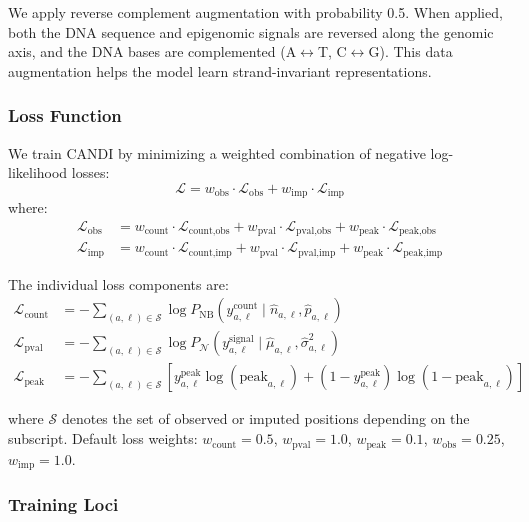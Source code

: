 We apply reverse complement augmentation with probability 0.5. When applied, both the DNA sequence and epigenomic signals are reversed along the genomic axis, and the DNA bases are complemented (A$\leftrightarrow$T, C$\leftrightarrow$G). This data augmentation helps the model learn strand-invariant representations.

\subsubsection{Loss Function}

We train CANDI by minimizing a weighted combination of negative log-likelihood losses:
\begin{equation}
    \mathcal{L} = w_{\text{obs}} \cdot \mathcal{L}_{\text{obs}} + w_{\text{imp}} \cdot \mathcal{L}_{\text{imp}}
\end{equation}
where:
\begin{align}
    \mathcal{L}_{\text{obs}} &= w_{\text{count}} \cdot \mathcal{L}_{\text{count,obs}} + w_{\text{pval}} \cdot \mathcal{L}_{\text{pval,obs}} + w_{\text{peak}} \cdot \mathcal{L}_{\text{peak,obs}} \\
    \mathcal{L}_{\text{imp}} &= w_{\text{count}} \cdot \mathcal{L}_{\text{count,imp}} + w_{\text{pval}} \cdot \mathcal{L}_{\text{pval,imp}} + w_{\text{peak}} \cdot \mathcal{L}_{\text{peak,imp}}
\end{align}

The individual loss components are:
\begin{align}
    \mathcal{L}_{\text{count}} &= -\sum_{(a,\ell) \in \mathcal{S}} \log P_{\text{NB}}\left(y_{a,\ell}^{\text{count}} \mid \hat{n}_{a,\ell}, \hat{p}_{a,\ell}\right) \\
    \mathcal{L}_{\text{pval}} &= -\sum_{(a,\ell) \in \mathcal{S}} \log P_{\mathcal{N}}\left(y_{a,\ell}^{\text{signal}} \mid \hat{\mu}_{a,\ell}, \hat{\sigma}^2_{a,\ell}\right) \\
    \mathcal{L}_{\text{peak}} &= -\sum_{(a,\ell) \in \mathcal{S}} \left[ y_{a,\ell}^{\text{peak}} \log(\text{peak}_{a,\ell}) + (1 - y_{a,\ell}^{\text{peak}}) \log(1 - \text{peak}_{a,\ell}) \right]
\end{align}

where $\mathcal{S}$ denotes the set of observed or imputed positions depending on the subscript. Default loss weights: $w_{\text{count}} = 0.5$, $w_{\text{pval}} = 1.0$, $w_{\text{peak}} = 0.1$, $w_{\text{obs}} = 0.25$, $w_{\text{imp}} = 1.0$.

\subsubsection{Training Loci}


